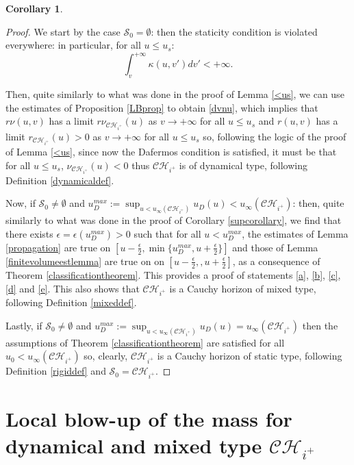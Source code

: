 \documentclass[10pt,a4paper]{article}
\theoremstyle{plain}
\newtheorem{cor}[thm]{Corollary}
\theoremstyle{remark}
\theoremstyle{definition}
\theoremstyle{plain}
\theoremstyle{remark}
\theoremstyle{definition}
\newcommand{\CH}{\mathcal{CH}_{i^+}}
\numberwithin{equation}{section}
\begin{document}
\begin{cor}
\end{cor}

\begin{proof} We start by the case $\mathcal{S}_0 =  \emptyset$: then the staticity condition is violated everywhere: in particular, for all $u \leq u_s$: $$ \int_{v}^{+\infty} \kappa(u,v') dv' < +\infty.$$
	
	Then, quite similarly to what was done in the proof of Lemma \ref{<us}, we can use the estimates of Proposition \ref{LBprop} to obtain \eqref{dvnu}, which implies that $r \nu(u,v)$ has a limit $r \nu_{\CH}(u)$ as  $v\rightarrow+\infty$ for all $u \leq u_s$ and $r(u,v)$ has a limit $r_{\CH}(u)>0$ as  $v\rightarrow+\infty$ for all $u \leq u_s$ so, following the logic of the proof of Lemma \ref{<us}, since now the Dafermos condition is satisfied, it must be that for all $u \leq u_s$, $ \nu_{\CH}(u)<0$ thus $\CH$ is of dynamical type, following Definition \ref{dynamicaldef}.
	
	Now, if $\mathcal{S}_0 \neq  \emptyset$ and $u_D^{max}:=\sup_{u <u_{\infty}(\CH)} u_D(u) <u_{\infty}(\CH)$: then, quite similarly to what was done in the proof of Corollary \ref{supcorollary}, we find that there exists $\epsilon=\epsilon(u_D^{max})>0$ such that for all $u < u_D^{max}$, the estimates of Lemma \ref{propagation} are true on $[u-\frac{\epsilon}{2} , \min\{u_D^{max}, u+\frac{\epsilon}{2}\}]$ and those of Lemma \ref{finitevolumeestlemma} are true on  on $[u-\frac{\epsilon}{2} , , u+\frac{\epsilon}{2}]$, as a consequence of Theorem \ref{classificationtheorem}. This provides a proof of statements \ref{a}, \ref{b}, \ref{c}, \ref{d} and \ref{e}. This also shows that $\CH$ is a Cauchy horizon of mixed type, following Definition \ref{mixeddef}.
	
	Lastly, if  $\mathcal{S}_0 \neq  \emptyset$ and $u_D^{max}:=\sup_{u <u_{\infty}(\CH)} u_D(u) =u_{\infty}(\CH)$ then the assumptions of Theorem \ref{classificationtheorem} are satisfied for all $u_0 <u_{\infty}(\CH)$ so, clearly, $\CH$ is a Cauchy horizon of static type, following Definition \ref{rigiddef} and $\mathcal{S}_0 = \CH$.
	
	
	
	
	
	
	
\end{proof}



\section{Local blow-up of the mass for dynamical and mixed type $\CH$} \label{localsection}
\end{document}
